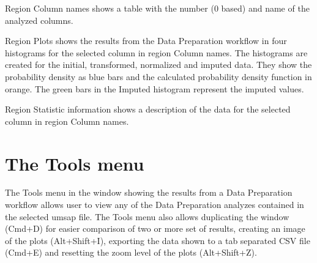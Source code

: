 Region Column names shows a table with the number (\num{0} based) and name of the
analyzed columns. 

Region Plots shows the results from the Data Preparation workflow in four histograms
for the selected column in region Column names. The histograms are created for the
initial, transformed, normalized and imputed data. They show the probability density
as blue bars and the calculated probability density function in orange. The green bars
in the Imputed histogram represent the imputed values.

Region Statistic information shows a description of the data for the selected column
in region Column names.

\section{The Tools menu}

The Tools menu in the window showing the results from a Data Preparation workflow
allows user to view any of the Data Preparation analyzes contained in the selected
umsap file. The Tools menu also allows duplicating the window (Cmd+D) for easier
comparison of two or more set of results, creating an image of the plots (Alt+Shift+I),
exporting the data shown to a tab separated CSV file (Cmd+E) and resetting the zoom
level of the plots (Alt+Shift+Z).